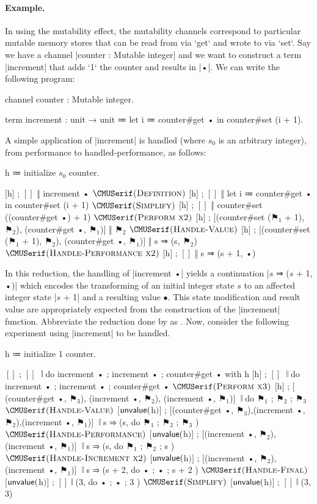 \paragraph{Example.}
In using the mutability effect, the mutability channels correspond to particular mutable memory stores that can be read from via \code`get` and wrote to via \code`set`.
Say we have a channel \code|counter : Mutable integer| and we want to construct a term \code|increment| that adds \code`1` the counter and results in \code|•|.
We can write the following program:
\begin{snippet}
channel counter : Mutable integer.

term increment : unit → unit
  ≔ let i ≔ counter#get • in
    counter#set (i + 1).
\end{snippet}
A simple application of \code|increment| is handled (where $s_0$ is an arbitrary integer), from performance to handled-performance, as follows:
\begin{snippet}
h ≔ initialize $s_0$ counter.

$[$h$]$ ; $[]$ ‖ increment •
$\ruleapp{Definition}$
$[$h$]$ ; $[]$ ‖ let i ≔ counter#get • in counter#set (i + 1)
$\ruleapp{Simplify}$
$[$h$]$ ; $[]$ ‖ counter#set ((counter#get •) + 1)
$\ruleapp{Perform x2}$
$[$h$]$ ; $[$(counter#set ($⚑_1$ + 1), $⚑_2$), (counter#get •, $⚑_1$)$]$ ‖ $⚑_2$
$\ruleapp{Handle-Value}$
$[$h$]$ ; $[$(counter#set ($⚑_1$ + 1), $⚑_2$), (counter#get •, $⚑_1$)$]$ ‖ s ⇒ (s, $⚑_2$)
$\ruleapp{Handle-Performance x2}$
$[$h$]$ ; $[]$ ‖ s ⇒ (s + 1, •)
\end{snippet}
In this reduction, the handling of \code|increment •| yields a continuation \code|$s$ ⇒ ($s$ + 1, •)| which encodes the transforming of an initial integer state $s$ to an affected integer state \code|$s$ + 1| and a resulting value $•$.
This state modification and result value are appropriately expected from the construction of the \code|increment| function.
Abbreviate the reduction done by  as .
Now, consider the following experiment using \code|increment| to be handled.
\begin{snippet}
h ≔ initialize 1 counter.

$[]$ ; $[]$ $ $
  $ $𝄁 do{ increment • ; increment • ; counter#get • } with h
$[$h$]$ ; $[]$ $ $
  $ $𝄁 do{ increment • ; increment • ; counter#get • }
$\ruleapp{Perform x3}$
$[$h$]$ ; $[$(counter#get •, $⚑_3$), (increment •, $⚑_2$), (increment •, $⚑_1$)$]$ $ $
  $ $𝄁 do{ $⚑_1$ ; $⚑_2$ ; $⚑_3$ }
$\ruleapp{Handle-Value}$
$[$$\mathsf{unvalue}($h$)$$]$ ; $[$(counter#get •, $⚑_3$),(increment •, $⚑_2$),(increment •, $⚑_1$)$]$ $ $
  $ $𝄁 s ⇒ (s, do{ $⚑_1$ ; $⚑_2$ ; $⚑_3$ })
$\ruleapp{Handle-Performance}$
$[$$\mathsf{unvalue}($h$)$$]$ ; $[$(increment •, $⚑_2$), (increment •, $⚑_1$)$]$ $ $
  $ $𝄁 s ⇒ (s, do{ $⚑_1$ ; $⚑_2$ ; s })
$\ruleapp{Handle-Increment x2}$
$[$$\mathsf{unvalue}($h$)$$]$ ; $[$(increment •, $⚑_2$), (increment •, $⚑_1$)$]$ $ $
  $ $𝄁 s ⇒ (s + 2, do{ • ; • ; s + 2 })
$\ruleapp{Handle-Final}$
$[$$\mathsf{unvalue}($h$)$$]$ ; $[]$ 𝄁 (3, do{ • ; • ; 3 })
$\ruleapp{Simplify}$
$[$$\mathsf{unvalue}($h$)$$]$ ; $[]$ 𝄁 (3, 3)
\end{snippet}

